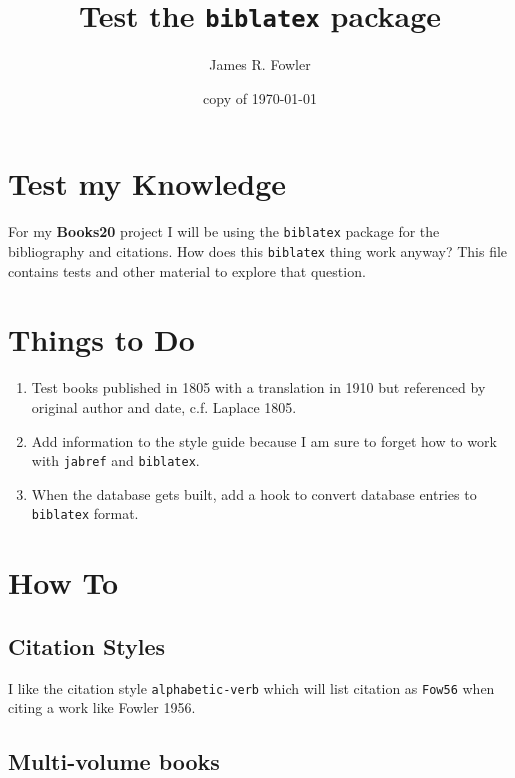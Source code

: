\documentclass{article}
\begin{document}
\title{Test the {\tt biblatex} package}
\author{James R. Fowler}
\date{copy of \today}
\maketitle


\section{Test my Knowledge}

For my {\bf Books20} project I will be using the {\tt biblatex}\cite{Kime2019}
package for the bibliography and citations.
How does this {\tt biblatex} thing work anyway? This
file contains tests and other material to explore that question.


\section{Things to Do}

\begin{enumerate}
  \item Test books published in 1805 with a translation in 1910
    but referenced by original author and date,
    c.f. Laplace 1805. \cite{Laplace1805}

  \item Add information to the style guide because I am sure to forget
    how to work with {\tt jabref} and {\tt biblatex}.

  \item When the database gets built, add a hook to convert database
    entries to {\tt biblatex} format.
\end{enumerate}

\section{How To}

\subsection{Citation Styles}

I like the citation style {\tt alphabetic-verb} which will
list citation as {\tt Fow56} when citing a work like Fowler 1956.

\subsection{Multi-volume books}
\end{document}
